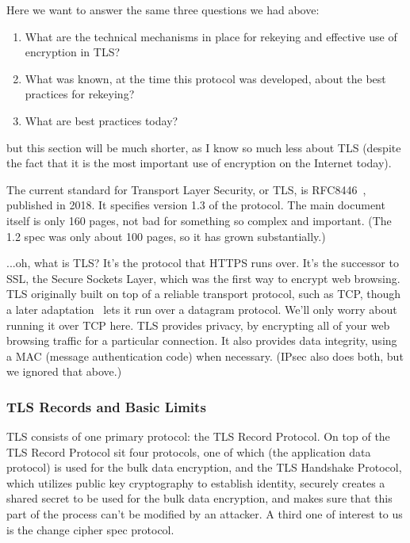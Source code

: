 \documentclass[%
 aip,
 jmp,%
 amsmath,amssymb,
 reprint,%
]{revtex4-1}
\begin{document}
Here we want to answer the same three questions we had above:

\begin{enumerate}
\item What are the technical mechanisms in place for rekeying and
   effective use of encryption in TLS?
\item What was known, at the time this protocol was developed, about
   the best practices for rekeying?
\item What are best practices today?
\end{enumerate}

but this section will be much shorter, as I know so much less about
TLS (despite the fact that it is the most important use of encryption
on the Internet today).

The current standard for Transport Layer Security, or TLS, is
RFC8446~\cite{RFC8446}, published in 2018.  It specifies version 1.3
of the protocol.  The main document itself is only 160 pages, not bad
for something so complex and important.  (The 1.2 spec was only about
100 pages, so it has grown substantially.)

...oh, what is TLS?  It's the protocol that HTTPS runs over.  It's the
successor to SSL, the Secure Sockets Layer, which was the first way to
encrypt web browsing.  TLS originally built on top of a reliable
transport protocol, such as TCP, though a later adaptation~\cite{RFC6347}
lets it run over a datagram protocol.  We'll only worry about running
it over TCP here.  TLS provides privacy, by encrypting all of your web
browsing traffic for a particular connection.  It also provides data
integrity, using a MAC (message authentication code) when necessary.
(IPsec also does both, but we ignored that above.)

\subsubsection{TLS Records and Basic Limits}

TLS consists of one primary protocol: the TLS Record Protocol.  On top
of the TLS Record Protocol sit four protocols, one of which (the
application data protocol) is used for the bulk data encryption, and
the TLS Handshake Protocol, which utilizes public key cryptography to
establish identity, securely creates a shared secret to be used for
the bulk data encryption, and makes sure that this part of the process
can't be modified by an attacker.  A third one of interest to us is
the change cipher spec protocol.
\end{document}
